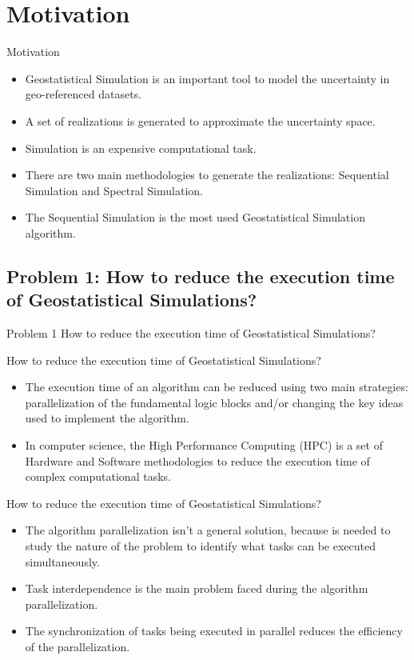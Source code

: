 \section{Motivation}

\begin{frame}{Motivation}
  \begin{itemize}
    \item Geostatistical Simulation is an important tool to model the uncertainty in geo-referenced datasets.
    \item A set of realizations is generated to approximate the uncertainty space.
    \item Simulation is an expensive computational task.
    \item There are two main methodologies to generate the realizations: Sequential Simulation and Spectral Simulation.
     \item The Sequential Simulation is the most used Geostatistical Simulation algorithm.
  \end{itemize}
\vskip 1cm
\end{frame}

\subsection{Problem 1: How to reduce the execution time of Geostatistical Simulations?}
\begin{frame}{Problem 1}	
How to reduce the execution time of Geostatistical Simulations? 
\end{frame}

\begin{frame}{How to reduce the execution time of Geostatistical Simulations?}
	\begin{itemize}
      \item The execution time of an algorithm can be reduced using two main strategies: parallelization of the fundamental logic blocks and/or changing the key ideas used to implement the algorithm.
		\item In computer science, the High Performance Computing (HPC) is a set of  Hardware and Software methodologies to reduce the execution time of complex computational tasks.    
    \end{itemize}
\end{frame}

\begin{frame}{How to reduce the execution time of Geostatistical Simulations?}
	\begin{itemize}
    	\item The algorithm parallelization isn't a general solution, because is needed to study the nature of the problem to identify what tasks can be executed simultaneously.
        \item Task interdependence is the main problem faced during the algorithm parallelization.
        \item  The synchronization of tasks being executed in parallel reduces the efficiency of the parallelization.
    \end{itemize}
\end{frame}

